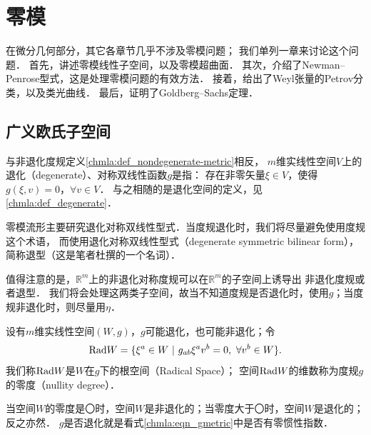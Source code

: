 
\chapter{零模}\label{chnull}

在微分几何部分，其它各章节几乎不涉及零模问题；
我们单列一章来讨论这个问题．
首先，讲述零模线性子空间，以及零模超曲面．
其次，介绍了Newman--Penrose型式，这是处理零模问题的有效方法．
接着，给出了Weyl张量的Petrov分类，以及类光曲线．
最后，证明了Goldberg--Sachs定理．


\section{广义欧氏子空间}\label{chnull:sec_indef-algebra}


与非退化度规定义\ref{chmla:def_nondegenerate-metric}相反，
$m$维实线性空间$V$上的退化（degenerate）、对称双线性函数$g$是指：
存在非零矢量$\xi \in V$，使得$g(\xi,v)=0$，$\forall v \in V$．
与之相随的是退化空间的定义，见\ref{chmla:def_degenerate}．

零模流形主要研究退化对称双线性型式．当度规退化时，我们将尽量避免使用度规这个术语，
而使用退化对称双线性型式（degenerate symmetric bilinear form），
简称{\heiti 退型}（这是笔者杜撰的一个名词）．


值得注意的是，$\mathbb{R}^m$上的非退化对称度规可以在$\mathbb{R}^m$的子空间上诱导出
非退化度规或者{\kaishu 退型}．
我们将会处理这两类子空间，故当不知道度规是否退化时，使用$g$；当度规非退化时，则尽量用$\eta$．

\begin{definition}
    设有$m$维实线性空间$(W,g)$，$g$可能退化，也可能非退化；令
    \begin{equation}
        {\rm Rad} W= \{\xi^a \in W \ |\  g_{ab} \xi^a v^b=0,\ \forall v^b\in W \} .
    \end{equation}
    我们称${\rm Rad} W$是$W$在$g$下的{\heiti 根空间}（Radical Space）；
    空间${\rm Rad} W$的维数称为度规$g$的{\heiti 零度}（nullity degree）．
\end{definition}


当空间$W$的零度是〇时，空间$W$是非退化的；当零度大于〇时，空间$W$是退化的；反之亦然．
$g$是否退化就是看式\eqref{chmla:eqn_gmetric}中是否有零惯性指数．


